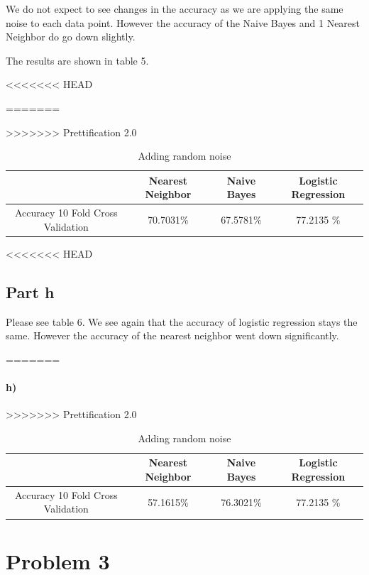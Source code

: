 \documentclass{article}
\begin{document}
\begin{table}[H]
\begin{table}[H]
\begin{table}[H]
\begin{table}[H]
We do not expect to see changes in the accuracy as we are applying the same noise to each data point. However the accuracy of the Naive Bayes and 1 Nearest Neighbor do go down slightly. 

The results are shown in table 5. 


<<<<<<< HEAD
\begin{table}[H]
=======
\begin{table}[ht]
>>>>>>> Prettification 2.0
    \begin{center}
    \caption{Adding 10 attributes}
    \begin{tabular}{|c|c|c|c|}
   \hline
        & Nearest Neighbor & Naive Bayes & Logistic Regression \\ \hline
         Accuracy 10 Fold Cross Validation &  70.7031\%&67.5781\% &  77.2135 \%  \\ \hline
        \end{tabular}
    \end{center}
\end{table}

<<<<<<< HEAD
\subsection{Part h}
Please see table 6. We see again that the accuracy of logistic regression stays the same. However the accuracy of the nearest neighbor went down significantly. 

\begin{table}[H]
=======
\paragraph{h)}

\begin{table}[ht]
>>>>>>> Prettification 2.0
    \begin{center}
    \caption{Adding random noise}
    \begin{tabular}{|c|c|c|c|}
   \hline
        & Nearest Neighbor & Naive Bayes & Logistic Regression \\ \hline
         Accuracy 10 Fold Cross Validation &  57.1615\%&76.3021\% &  77.2135 \%  \\ \hline
        \end{tabular}
    \end{center}
\end{table}


\section{Problem 3}


\end{table}
\end{table}
\end{table}
\end{table}
\end{table}
\end{table}
\end{document}
